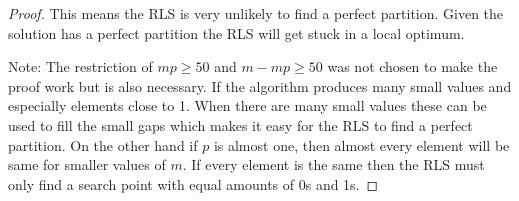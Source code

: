 \begin{proof}
    This means the RLS is very unlikely to find a perfect partition.
    Given the solution has a perfect partition the RLS will get stuck in a local optimum.

    Note: The restriction of $mp\ge50$ and $m-mp\ge50$ was not chosen to make the proof work but is also necessary.
    If the algorithm produces many small values and especially elements close to 1.
    When there are many small values these can be used to fill the small gaps which makes it easy for the RLS to find a perfect partition.
    On the other hand if $p$ is almost one, then almost every element will be same for smaller values of $m$.
    If every element is the same then the RLS must only find a search point with equal amounts of 0s and 1s.
\end{proof}